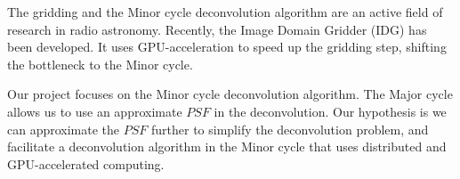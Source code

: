 The gridding and the Minor cycle deconvolution algorithm are an active field of research in radio astronomy. Recently, the Image Domain Gridder (IDG)\cite{veenboer2017image} has been developed. It uses GPU-acceleration to speed up the gridding step, shifting the bottleneck to the Minor cycle.

Our project focuses on the Minor cycle deconvolution algorithm. The Major cycle allows us to use an approximate $PSF$ in the deconvolution. Our hypothesis is we can approximate the $PSF$ further to simplify the deconvolution problem, and facilitate a deconvolution algorithm in the Minor cycle that uses distributed and GPU-accelerated computing.

